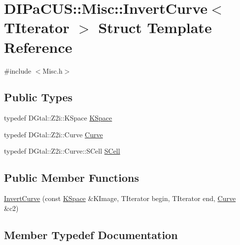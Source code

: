 \hypertarget{structDIPaCUS_1_1Misc_1_1InvertCurve}{}\section{D\+I\+Pa\+C\+US\+:\+:Misc\+:\+:Invert\+Curve$<$ T\+Iterator $>$ Struct Template Reference}
\label{structDIPaCUS_1_1Misc_1_1InvertCurve}


{\ttfamily \#include $<$Misc.\+h$>$}

\subsection*{Public Types}
\begin{DoxyCompactItemize}
\item 
typedef D\+Gtal\+::\+Z2i\+::\+K\+Space \hyperlink{structDIPaCUS_1_1Misc_1_1InvertCurve_a64773d7b4da91e66b4cc83112d4aa1d1}{K\+Space}
\item 
typedef D\+Gtal\+::\+Z2i\+::\+Curve \hyperlink{structDIPaCUS_1_1Misc_1_1InvertCurve_a4a338524a4f9be41169d6eeb519c6a20}{Curve}
\item 
typedef D\+Gtal\+::\+Z2i\+::\+Curve\+::\+S\+Cell \hyperlink{structDIPaCUS_1_1Misc_1_1InvertCurve_a57f4545d1903fd3953018413c6fd61aa}{S\+Cell}
\end{DoxyCompactItemize}
\subsection*{Public Member Functions}
\begin{DoxyCompactItemize}
\item 
\hyperlink{structDIPaCUS_1_1Misc_1_1InvertCurve_a551b582c8c9abf2f86937a7c7468491e}{Invert\+Curve} (const \hyperlink{structDIPaCUS_1_1Misc_1_1InvertCurve_a64773d7b4da91e66b4cc83112d4aa1d1}{K\+Space} \&K\+Image, T\+Iterator begin, T\+Iterator end, \hyperlink{structDIPaCUS_1_1Misc_1_1InvertCurve_a4a338524a4f9be41169d6eeb519c6a20}{Curve} \&c2)
\end{DoxyCompactItemize}


\subsection{Member Typedef Documentation}
\mbox{\label{structDIPaCUS_1_1Misc_1_1InvertCurve_a4a338524a4f9be41169d6eeb519c6a20}} 
